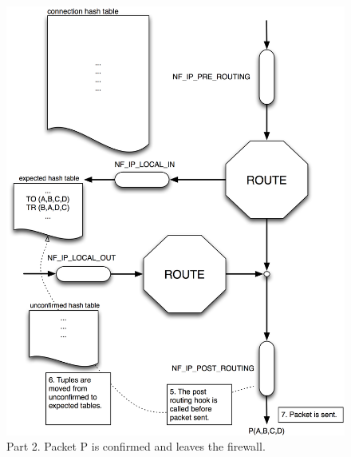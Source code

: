 \documentclass[a4paper,10pt]{article}
\begin{document}
\begin{figure}[H]
  \centering
  \includegraphics[totalheight=0.90\textheight]{images/conntrack_flow2.png}
  \caption{Part 2. Packet P is confirmed and leaves the firewall.}\label{fig:conntrack_flow2}
\end{figure}
\end{document}
